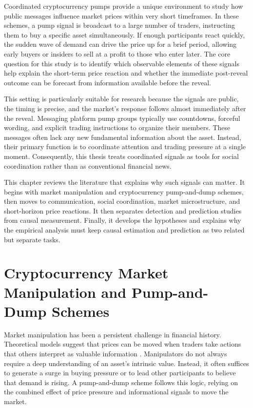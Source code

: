 Coordinated cryptocurrency pumps provide a unique environment to study how public messages influence market prices within very short timeframes. In these schemes, a pump signal is broadcast to a large number of traders, instructing them to buy a specific asset simultaneously. If enough participants react quickly, the sudden wave of demand can drive the price up for a brief period, allowing early buyers or insiders to sell at a profit to those who enter later. The core question for this study is to identify which observable elements of these signals help explain the short-term price reaction and whether the immediate post-reveal outcome can be forecast from information available before the reveal.

This setting is particularly suitable for research because the signals are public, the timing is precise, and the market's response follows almost immediately after the reveal. Messaging platform pump groups typically use countdowns, forceful wording, and explicit trading instructions to organize their members. These messages often lack any new fundamental information about the asset. Instead, their primary function is to coordinate attention and trading pressure at a single moment. Consequently, this thesis treats coordinated signals as tools for social coordination rather than as conventional financial news.

This chapter reviews the literature that explains why such signals can matter. It begins with market manipulation and cryptocurrency pump-and-dump schemes, then moves to communication, social coordination, market microstructure, and short-horizon price reactions. It then separates detection and prediction studies from causal measurement. Finally, it develops the hypotheses and explains why the empirical analysis must keep causal estimation and prediction as two related but separate tasks.

\section{Cryptocurrency Market Manipulation and Pump-and-Dump Schemes}
\label{sec:crypto-manipulation-literature}

Market manipulation has been a persistent challenge in financial history. Theoretical models suggest that prices can be moved when traders take actions that others interpret as valuable information \cite{allen1992stock}. Manipulators do not always require a deep understanding of an asset's intrinsic value. Instead, it often suffices to generate a surge in buying pressure or to lead other participants to believe that demand is rising. A pump-and-dump scheme follows this logic, relying on the combined effect of price pressure and informational signals to move the market.

